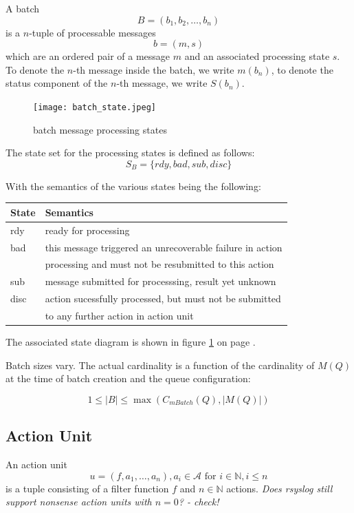 \documentclass[a4paper,10pt]{article}
\newcommand{\IN}{\mathbb{N}}
\newcommand{\AAA}{\mathcal{A}}
\begin{document}
A batch
$$B = (b_1, b_2, \ldots, b_n )$$
is a $n$-tuple of processable messages
$$b = (m, s)$$
which are an ordered pair of a message $m$ and an associated processing state $s$. To denote the $n$-th message inside the batch, we write $m(b_n)$, to denote the status component of the $n$-th message, we write $S(b_n)$.

\begin{figure}
\begin{center}
\texttt{[image: batch\_state.jpeg]}
\end{center}
\caption{batch message processing states}
\label{fig_batchmsg_states}
\end{figure}

The state set for the processing states is defined as follows:
$$
S_B = \{ rdy, bad, sub, disc \}
$$

With the semantics of the various states being the following:

\begin{center}
\begin{tabular}{|l|l|} \hline
	State		& Semantics \\\hline
	rdy 		& ready for processing\\
	bad		& this message triggered an unrecoverable failure in action\\
			& processing and must not be resubmitted to this action\\
	sub		& message submitted for processsing, result yet unknown \\
	disc		& action sucessfully processed, but must not be submitted \\
			& to any further action in action unit \\\hline
\end{tabular}
\end{center}
The associated state diagram is shown in figure \ref{fig_batchmsg_states} on page \pageref{fig_batchmsg_states}.

Batch sizes vary. The actual cardinality is a function of the cardinality of $M(Q)$ at the time of batch creation and the queue configuration:

$$1 \leq |B| \leq \max(C_{mBatch}(Q), |M(Q)|)$$

\subsection{Action Unit}
An action unit 
$$u = (f, a_1, \ldots, a_n), a_i \in \AAA \text{ for } i \in \IN, i \le n$$
is a tuple consisting of a filter function $f$ and $n \in \IN$ actions. \emph{Does rsyslog still support nonsense action units with $n=0$? - check!}
\end{document}

